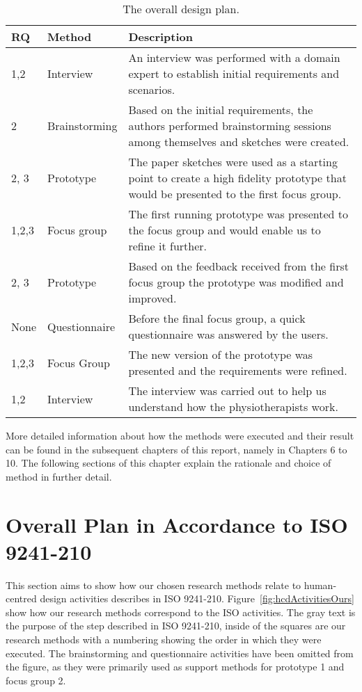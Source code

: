 \begin{table}[h!]
  \centering
  \begin{tabular}{|p{0.7cm}|p{2.2cm}|p{8.8cm}|}
    \hline
    \textbf{RQ} & \textbf{Method} & \textbf{Description} \\ \hline
    1,2 & Interview & An interview was performed with a domain expert to establish initial requirements and scenarios. \\ \hline
    2 & Brainstorming & Based on the initial requirements, the authors performed brainstorming sessions among themselves and sketches were created. \\ \hline
    2, 3 & Prototype & The paper sketches were used as a starting point to create a high fidelity prototype that would be presented to the first focus group. \\ \hline
    1,2,3 & Focus group & The first running prototype was presented to the focus group and would enable us to refine it further. \\ \hline
    2, 3 & Prototype & Based on the feedback received from the first focus group the prototype was modified and improved. \\ \hline
    None & Questionnaire & Before the final focus group, a quick questionnaire was answered by the users. \\ \hline
    1,2,3 & Focus Group & The new version of the prototype was presented and the requirements were refined. \\ \hline
    1,2 & Interview & The interview was carried out to help us understand how the physiotherapists work. \\ \hline
  \end{tabular}
  \caption[Overall design plan]{The overall design plan.}
  \label{tab:designPlan}
\end{table}

More detailed information about how the methods were executed and their result can be found in the subsequent chapters of this report, namely in Chapters 6 to 10. The following sections of this chapter explain the rationale and choice of method in further detail.
 
\section{Overall Plan in Accordance to ISO 9241-210}
This section aims to show how our chosen research methods relate to human-centred design activities describes in ISO 9241-210. Figure~\ref{fig:hcdActivitiesOurs} show how our research methods correspond to the ISO activities. The gray text is the purpose of the step described in ISO 9241-210, inside of the squares are our research methods with a numbering showing the order in which they were executed. The brainstorming and questionnaire activities have been omitted from the figure, as they were primarily used as support methods for prototype 1 and focus group 2.

